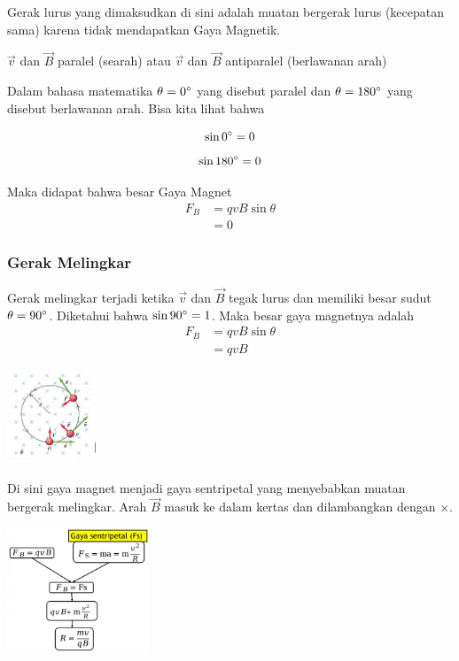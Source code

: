 \documentclass[twocolumn, 11pt]{article}%
\begin{document}
Gerak lurus yang dimaksudkan di sini adalah muatan bergerak lurus
(kecepatan sama) karena tidak mendapatkan Gaya Magnetik.

$\vec v$ dan $\vec B$ paralel (searah) atau $\vec v$ dan $\vec B$
antiparalel (berlawanan arah)

Dalam bahasa matematika $\theta = 0\degree$ yang disebut paralel dan
$\theta = 180\degree$ yang disebut berlawanan arah. Bisa kita lihat bahwa

\[ \sin 0\degree = 0\]
\[ \sin 180\degree = 0\]

Maka didapat bahwa besar Gaya Magnet
\begin{align*}
    F_B &= qvB\sin\theta\\
        &= 0
\end{align*}

\subsubsection{Gerak Melingkar}%
Gerak melingkar terjadi ketika $\vec v$ dan $\vec B$ tegak lurus dan
memiliki besar sudut $\theta=90\degree$. Diketahui bahwa $\sin
90\degree=1$. Maka besar gaya magnetnya adalah
\begin{align*}
    F_B &= qvB\sin\theta\\
        &= qvB
\end{align*}

\begin{center}
    \includegraphics[width=100px]{8.png}
\end{center}

Di sini gaya magnet menjadi gaya sentripetal yang menyebabkan muatan
bergerak melingkar. Arah $\vec B$ masuk ke dalam kertas dan dilambangkan
dengan $\times$.

\begin{center}
    \includegraphics[width=160px]{9.png}
\end{center}
\end{document}
